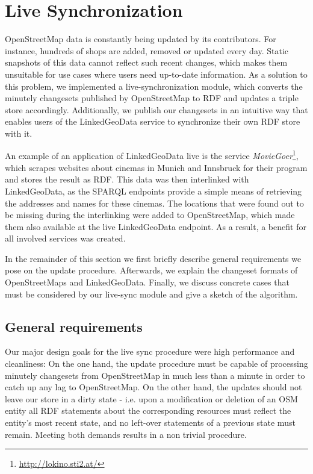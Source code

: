 \section{Live Synchronization}
\label{sec:synchronization}

OpenStreetMap data is constantly being updated by its contributors.
For instance, hundreds of shops are added, removed or updated
every day. Static snapshots of this data cannot reflect such recent changes,
which makes them unsuitable for use cases where users need up-to-date information. As a
solution to this problem, we implemented a live-synchronization module, which converts the minutely
changesets published by OpenStreetMap to RDF and updates a triple store
accordingly. Additionally, we publish our changesets in an intuitive way that
enables users of the LinkedGeoData service to synchronize their own RDF store
with it.

An example of an application of LinkedGeoData live is the service
\emph{MovieGoer}\footnote{\url{http://lokino.sti2.at/}}, which scrapes websites
about cinemas in Munich and Innsbruck for their program and stores the result as
RDF. This data was then interlinked with
LinkedGeoData, as the SPARQL endpoints provide a simple means of retrieving the
addresses and names for these cinemas. The locations that were found out to be
missing during the interlinking were added to OpenStreetMap, which made them
also available at the live LinkedGeoData endpoint. As a result, a benefit for
all involved services was created.
   

In the remainder of this section we first briefly describe general requirements
we pose on the update procedure. Afterwards, we explain the changeset formats of
OpenStreetMaps and LinkedGeoData. Finally, we discuss concrete cases that must be  
considered by our live-sync module and give a sketch of the algorithm.


\subsection{General requirements}
Our major design goals for the live sync procedure were high
performance and cleanliness: On the one hand, the update procedure must be
capable of processing minutely changesets from OpenStreetMap in much
less than a minute in order to catch up any lag to
OpenStreetMap. On the other hand, the updates should not leave our store in a
dirty state -  i.e. upon a modification or deletion of an OSM entity all
RDF statements about the corresponding resources must reflect the entity's most
recent state, and no left-over statements of a previous state must remain.
Meeting both demands results in a non trivial procedure.



